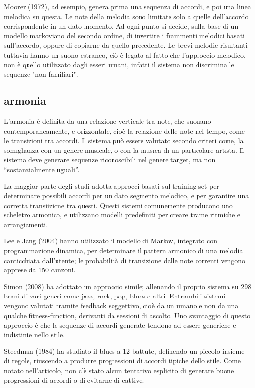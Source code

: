 \documentclass[a4paper,12pt]{report}
\begin{document}
Moorer (1972), ad esempio, genera prima una sequenza di accordi, e poi una linea melodica su questa.
Le note della melodia sono limitate solo a quelle dell'accordo corrispondente in un dato momento. 
Ad ogni punto si decide, sulla base di un modello markoviano del secondo ordine, di invertire i frammenti melodici basati sull'accordo, oppure di copiarne da quello precedente.
Le brevi melodie risultanti tuttavia hanno un suono estraneo, ciò è legato al fatto che l'approccio melodico, non è quello utilizzato dagli esseri umani, infatti il sistema non discrimina le sequenze "non familiari".

\subsection{armonia}

L'armonia è definita da una relazione verticale tra note, che suonano contemporaneamente, e orizzontale, cioè la relazione delle note nel tempo, come le transizioni tra accordi.
Il sistema può essere valutato secondo criteri come, la somiglianza con un genere musicale, o con la musica di un particolare artista.
Il sistema deve generare sequenze riconoscibili nel genere target, ma non “sostanzialmente uguali”.

La maggior parte degli studi adotta approcci basati sul training-set per determinare possibili accordi per un dato segmento melodico, e per garantire una corretta transiizione tra questi.
Questi sistemi comunemente producono uno scheletro armonico, e utilizzano modelli predefiniti per creare trame ritmiche e arrangiamenti.

Lee e Jang (2004) hanno utilizzato il modello di Markov, integrato con programmazione dinamica, per determinare il pattern armonico di una melodia canticchiata dall'utente; 
le probabilità di transizione dalle note correnti vengono apprese da 150 canzoni. 

Simon (2008) ha adottato un approccio simile; allenando il proprio sistema su 298 brani di vari generi come jazz, rock, pop, blues e altri. 
Entrambi i sistemi vengono valutati tramite feedback soggettivo, cioè da un umano e non da una qualche fitness-function, derivanti da sessioni di ascolto. 
Uno svantaggio di questo approccio è che le sequenze di accordi generate tendono ad essere generiche e indistinte nello stile.

Steedman (1984) ha studiato il blues a 12 battute, definendo un piccolo insieme di regole, riuscendo a produrre progressioni di accordi tipiche dello stile.
Come notato nell'articolo, non c'è stato alcun tentativo esplicito di generare buone progressioni di accordi o di evitarne di cattive. 
\end{document}
